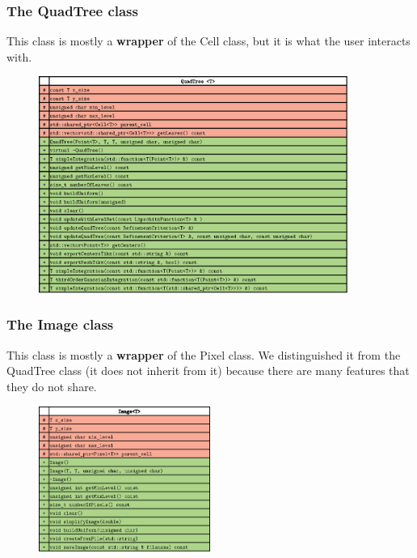 \documentclass[8pt]{beamer}
\begin{document}
\begin{frame}
 \frametitle{The QuadTree class}\pause
This class is mostly a \textbf{wrapper} of the Cell class, but it is what the user interacts with.
\begin{figure}[!h]
\begin{center}
\includegraphics[width=0.9\textwidth]{./figures/quadtree_h.eps}
\end{center}
\end{figure}
\end{frame}

\begin{frame}
 \frametitle{The Image class}\pause
This class is mostly a \textbf{wrapper} of the Pixel class.
We distinguished it from the QuadTree class (it does not inherit from it) because there are many features that they do not share.
\begin{figure}[!h]
\begin{center}
\includegraphics[width=0.5\textwidth]{./figures/image_h.eps}
\end{center}
\end{figure}
\end{frame}
\end{document}
